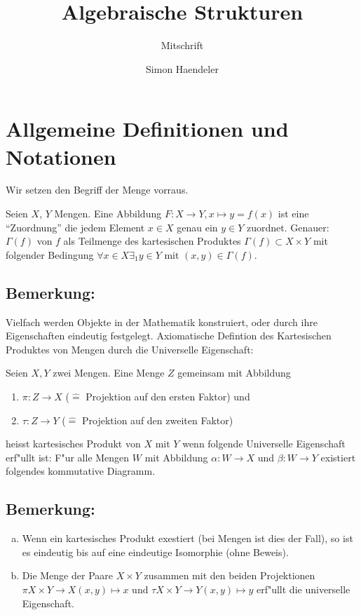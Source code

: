 \documentclass[12pt,a4paper,ngerman]{scrreprt}
\begin{document}
\title{Algebraische Strukturen}
\subtitle{Mitschrift}
\author{Simon Haendeler}
\maketitle
\setcounter{chapter}{-1}
\chapter{Allgemeine Definitionen und Notationen}
Wir setzen den Begriff der Menge vorraus.

Seien $X$, $Y$ Mengen. Eine Abbildung $F: X \to Y, x \mapsto y = f(x)$ ist eine "`Zuordnung"' die jedem Element $x \in X$ genau ein $y \in Y$ zuordnet.
Genauer: $\Gamma(f)$ von $f$ als Teilmenge des kartesischen Produktes $\Gamma(f) \subset X \times Y$ mit folgender Bedingung $\forall x \in X \exists _1  y \in Y$ mit $(x,y) \in \Gamma(f)$.

\section{Bemerkung:}
Vielfach werden Objekte in der Mathematik konstruiert, oder durch ihre Eigenschaften eindeutig festgelegt. Axiomatische Defintion des Kartesischen Produktes von Mengen durch die Universelle Eigenschaft:


Seien $X, Y$ zwei Mengen. 
Eine Menge $Z$ gemeinsam mit Abbildung
\begin{enumerate}[]
\item $\pi: Z \to X$ ($\widehat{=}$ Projektion auf den ersten Faktor) und 
\item $\tau: Z \to Y$ ($\widehat{=}$ Projektion auf den zweiten Faktor)
\end{enumerate}
heisst kartesisches Produkt von $X$ mit $Y$ wenn folgende Universelle Eigenschaft erf"ullt ist: F"ur alle Mengen $W$ mit Abbildung $\alpha: W \to X$ und $\beta: W \to Y$ existiert folgendes kommutative Diagramm.


\section{Bemerkung:}
\begin{enumerate}[(a)]
\item Wenn ein kartesisches Produkt exestiert (bei Mengen ist dies der Fall), so ist es eindeutig bis auf eine eindeutige Isomorphie (ohne Beweis). 

\item Die Menge der Paare $X \times Y$ zusammen mit den beiden Projektionen $\pi X \times Y \to X (x,y) \mapsto x$ und $\tau X \times Y \to Y (x,y) \mapsto y$ erf"ullt die universelle Eigenschaft.
\end{enumerate}
\end{document}
